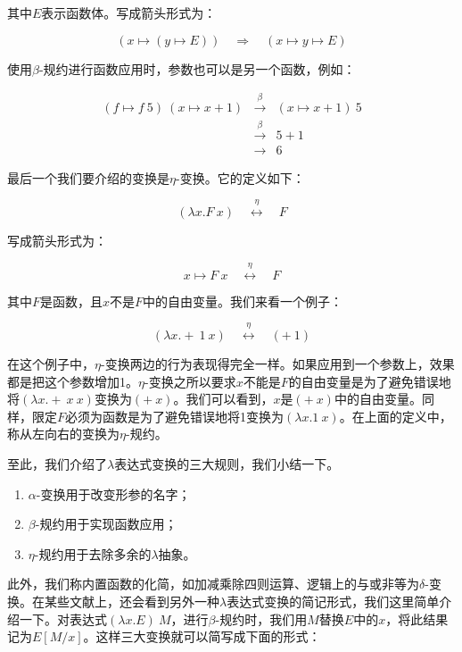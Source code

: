\documentclass{article}
\begin{document}
其中$E$表示函数体。写成箭头形式为：

\[
(x \mapsto (y \mapsto E)) \quad \Rightarrow \quad (x \mapsto y \mapsto E)
\]

使用$\beta$-规约进行函数应用时，参数也可以是另一个函数，例如：

\[
\begin{array}{rcl}
(f \mapsto f\ 5)\ (x \mapsto x + 1) & \overset{\beta}{\longrightarrow} & (x \mapsto x + 1)\ 5 \\
                                    & \overset{\beta}{\longrightarrow} & 5 + 1 \\
                                    & \longrightarrow & 6
\end{array}
\]

最后一个我们要介绍的变换是$\eta$-变换。它的定义如下：

\[
(\lambda x . F\ x) \quad \overset{\eta}{\longleftrightarrow} \quad F
\]

写成箭头形式为：

\[
x \mapsto F\ x \quad \overset{\eta}{\longleftrightarrow} \quad F
\]

其中$F$是函数，且$x$不是$F$中的自由变量。我们来看一个例子：

\[
(\lambda x . +\ 1\ x) \quad \overset{\eta}{\longleftrightarrow} \quad (+\ 1)
\]

在这个例子中，$\eta$-变换两边的行为表现得完全一样。如果应用到一个参数上，效果都是把这个参数增加1。$\eta$-变换之所以要求$x$不能是$F$的自由变量是为了避免错误地将$(\lambda x. +\ x\ x)$变换为$(+\ x)$。我们可以看到，$x$是$(+\ x)$中的自由变量。同样，限定$F$必须为函数是为了避免错误地将1变换为$(\lambda x . 1\ x)$。在上面的定义中，称从左向右的变换为$\eta$-规约。

至此，我们介绍了$\lambda$表达式变换的三大规则，我们小结一下。

\begin{enumerate}
\item $\alpha$-变换用于改变形参的名字；
\item $\beta$-规约用于实现函数应用；
\item $\eta$-规约用于去除多余的$\lambda$抽象。
\end{enumerate}

此外，我们称内置函数的化简，如加减乘除四则运算、逻辑上的与或非等为$\delta$-变换。在某些文献上，还会看到另外一种$\lambda$表达式变换的简记形式，我们这里简单介绍一下。对表达式$(\lambda x. E)\ M$，进行$\beta$-规约时，我们用$M$替换$E$中的$x$，将此结果记为$E[M/x]$。这样三大变换就可以简写成下面的形式：
\end{document}
